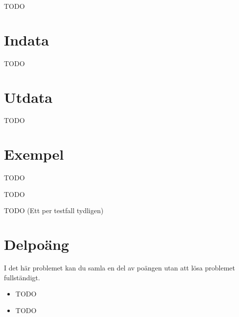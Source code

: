 TODO

\section*{Indata}
TODO

\section*{Utdata}
TODO

\section*{Exempel}
TODO

TODO

TODO (Ett per testfall tydligen)

\section*{Delpoäng}
I det här problemet kan du samla en del av poängen utan att lösa problemet fullständigt.

\begin{itemize}
    \item TODO
    \item TODO
\end{itemize}
